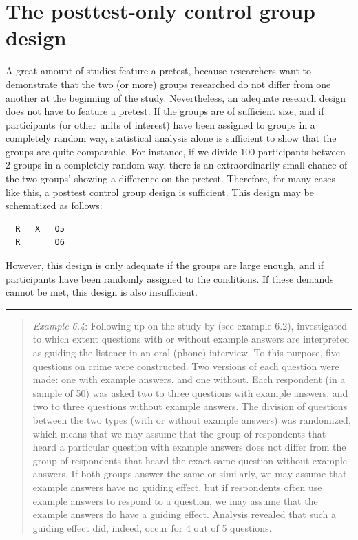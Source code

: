 \documentclass[
]{book}
\begin{document}
\section{The posttest-only control group design}\label{the-posttest-only-control-group-design}

A great amount of studies feature a pretest, because researchers want to demonstrate that the two (or more) groups researched do not differ from one another at the beginning of the study. Nevertheless, an adequate research design does not have to feature a pretest. If the groups are of sufficient size, and if participants (or other units of interest) have been assigned to groups in a completely random way, statistical analysis alone is sufficient to show that the groups are quite comparable. For instance, if we divide 100 participants between 2 groups in a completely random way, there is an extraordinarily small chance of the two groups' showing a difference on the pretest. Therefore, for many cases like this, a posttest control group design is sufficient. This design may be schematized as follows:

\begin{verbatim}
  R   X   O5
  R       O6
\end{verbatim}

However, this design is only adequate if the groups are large enough, and if participants have been randomly assigned to the conditions. If these demands cannot be met, this design is also insufficient.

\begin{center}\rule{0.5\linewidth}{0.5pt}\end{center}

\begin{quote}
\emph{Example 6.4}: Following up on the study by \citet{Houtk91} (see example 6.2), \citet{Wijff92} investigated to which extent questions with or without example answers are interpreted as guiding the listener in an oral (phone) interview. To this purpose, five questions on crime were constructed. Two versions of each question were made: one with example answers, and one without. Each respondent (in a sample of 50) was asked two to three questions with example answers, and two to three questions without example answers. The division of questions between the two types (with or without example answers) was randomized, which means that we may assume that the group of respondents that heard a particular question with example answers does not differ from the group of respondents that heard the exact same question without example answers. If both groups answer the same or similarly, we may assume that example answers have no guiding effect, but if respondents often use example answers to respond to a question, we may assume that the example answers do have a guiding effect. Analysis revealed that such a guiding effect did, indeed, occur for 4 out of 5 questions.
\end{quote}
\end{document}
